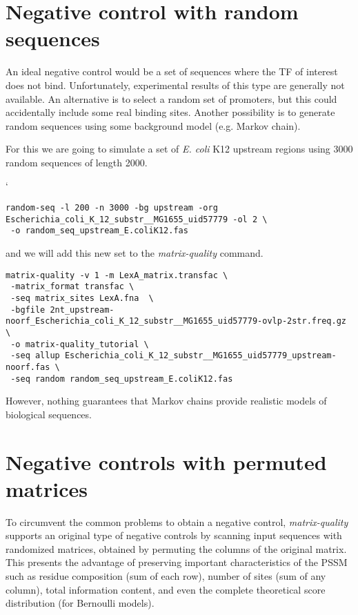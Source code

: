 \section{Negative control with random sequences}

An ideal negative control would be a set of sequences where the TF of
interest does not bind. Unfortunately, experimental results of this
type are generally not available. An alternative is to select a random
set of promoters, but this could accidentally include some real
binding sites. Another possibility is to generate random sequences
using some background model (e.g. Markov chain).

For this we are going to simulate a set of \textit{E. coli} K12
upstream regions using 3000 random sequences of length 2000.


{\color{Blue} `
\begin{footnotesize} 
\begin{verbatim}
random-seq -l 200 -n 3000 -bg upstream -org Escherichia_coli_K_12_substr__MG1655_uid57779 -ol 2 \
 -o random_seq_upstream_E.coliK12.fas
\end{verbatim} 
\end{footnotesize}
}

and we will add this new set to the \textit{matrix-quality} command.

{\color{Blue} 
\begin{footnotesize}
\begin{verbatim}
matrix-quality -v 1 -m LexA_matrix.transfac \
 -matrix_format transfac \
 -seq matrix_sites LexA.fna  \
 -bgfile 2nt_upstream-noorf_Escherichia_coli_K_12_substr__MG1655_uid57779-ovlp-2str.freq.gz \
 -o matrix-quality_tutorial \
 -seq allup Escherichia_coli_K_12_substr__MG1655_uid57779_upstream-noorf.fas \
 -seq random random_seq_upstream_E.coliK12.fas
\end{verbatim} 
\end{footnotesize} }

However, nothing guarantees that Markov chains provide realistic
models of biological sequences.

\section{Negative controls with permuted matrices}

To circumvent the common problems to obtain a negative
control,\textit{ matrix-quality} supports an original type of negative
controls by scanning input sequences with randomized matrices,
obtained by permuting the columns of the original matrix. This
presents the advantage of preserving important characteristics of the
PSSM such as residue composition (sum of each row), number of sites
(sum of any column), total information content, and even the complete
theoretical score distribution (for Bernoulli models).

